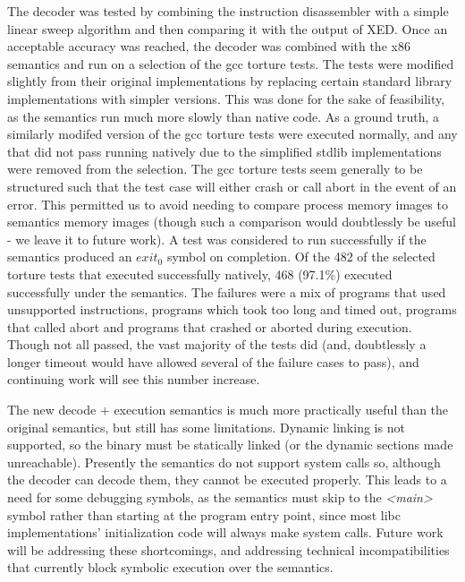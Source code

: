 The decoder was tested by combining the instruction disassembler with a simple linear sweep algorithm and then comparing it with the output of XED.  Once an acceptable accuracy was reached, the decoder was combined with the x86 semantics and run on a selection of the gcc torture tests.  The tests were modified slightly from their original implementations by replacing certain standard library implementations with simpler versions.  This was done for the sake of feasibility, as the semantics run much more slowly than native code.  As a ground truth, a similarly modifed version of the gcc torture tests were executed normally, and any that did not pass running natively due to the simplified stdlib implementations were removed from the selection.  The gcc torture tests seem generally to be structured such that the test case will either crash or call abort in the event of an error.  This permitted us to avoid needing to compare process memory images to semantics memory images (though such a comparison would doubtlessly be useful - we leave it to future work).  A test was considered to run successfully if the semantics produced an $exit_0$ symbol on completion.  Of the 482 of the selected torture tests that executed successfully natively, 468 (97.1\%) executed successfully under the semantics.  The failures were a mix of programs that used unsupported instructions, programs which took too long and timed out, programs that called abort and programs that crashed or aborted during execution.  Though not all passed, the vast majority of the tests did (and, doubtlessly a longer timeout would have allowed several of the failure cases to pass), and continuing work will see this number increase.

The new decode $+$ execution semantics is much more practically useful than the original semantics, but still has some limitations.  Dynamic linking is not supported, so the binary must be statically linked (or the dynamic sections made unreachable).  Presently the semantics do not support system calls so, although the decoder can decode them, they cannot be executed properly.  This leads to a need for some debugging symbols, as the semantics must skip to the \emph{<main>} symbol rather than starting at the program entry point, since most libc implementations’ initialization code will always make system calls.  Future work will be addressing these shortcomings, and addressing technical incompatibilities that currently block symbolic execution over the semantics.

